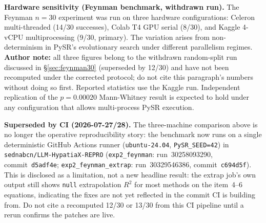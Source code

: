 \documentclass[twoside,11pt]{article}
\newcommand{\Rsq}{R^{2}}
\begin{document}
\textbf{Hardware sensitivity (Feynman benchmark, withdrawn run).}  The Feynman $n=30$ experiment was
run on three hardware configurations: Celeron multi-threaded (14/30 successes),
Colab T4 GPU serial (8/30), and Kaggle 4-vCPU multiprocessing (9/30, primary).
The variation arises from non-determinism in PySR's evolutionary search under
different parallelism regimes. \textbf{Author note:} all three figures belong
to the withdrawn random-split run discussed in \S\ref{sec:feynman30}
(superseded by 12/30) and have not been recomputed under the corrected
protocol; do not cite this paragraph's numbers without doing so first.
Reported statistics use the Kaggle run.
Independent replication of the $p=0.00020$ Mann-Whitney result is expected to hold
under any configuration that allows multi-process PySR execution.

\textbf{Superseded by CI (2026-07-27/28).} The three-machine comparison above
is no longer the operative reproducibility story: the benchmark now runs on a
single deterministic GitHub Actions runner (\texttt{ubuntu-24.04},
\texttt{PySR\_SEED=42}) in \texttt{sednabcn/LLM-HypatiaX-REPRO}
(\texttt{exp2\_feynman}: run~30258093290, commit~\texttt{d5adf4e};
\texttt{exp2\_feynman\_extrap}: run~30329546386, commit~\texttt{c694d5f}).
This is disclosed as a limitation, not a new headline result: the extrap
job's own output still shows \texttt{null} extrapolation $\Rsq$ for most
methods on the item~4--6 equations, indicating the fixes are not yet
reflected in the commit CI is building from. Do not cite a recomputed
12/30 or 13/30 from this CI pipeline until a rerun confirms the patches
are live.




\appendix
\end{document}

